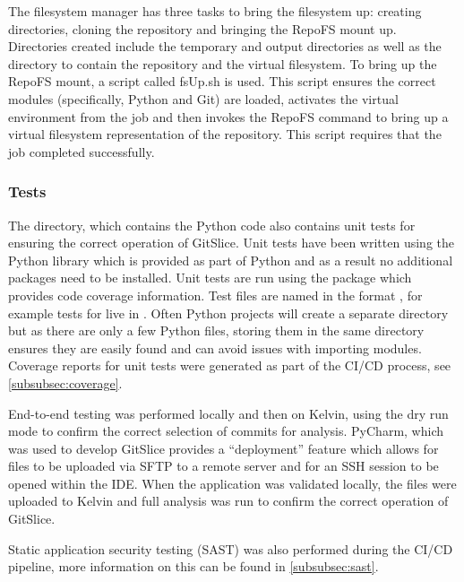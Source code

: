 \documentclass[11pt]{article}
\begin{document}
    The filesystem manager has three tasks to bring the filesystem up: creating directories, cloning the repository and bringing the RepoFS mount up.
    Directories created include the temporary and output directories as well as the directory to contain the repository and the virtual filesystem.
    To bring up the RepoFS mount, a script called fsUp.sh is used.
    This script ensures the correct modules (specifically, Python and Git) are loaded, activates the virtual environment from the  job and then invokes the RepoFS command to bring up a virtual filesystem representation of the repository.
    This script requires that the  job completed successfully.
    
    \subsubsection{Tests}
    \label{subsubsec:tests}

    The  directory, which contains the Python code also contains unit tests for ensuring the correct operation of GitSlice.
    Unit tests have been written using the Python  library which is provided as part of Python and as a result no additional packages need to be installed.
    Unit tests are run using the  package which provides code coverage information.
    Test files are named in the format , for example tests for  live in .
    Often Python projects will create a separate  directory but as there are only a few Python files, storing them in the same directory ensures they are easily found and can avoid issues with importing modules.
    Coverage reports for unit tests were generated as part of the CI/CD process, see \autoref{subsubsec:coverage}.

    End-to-end testing was performed locally and then on Kelvin, using the dry run mode to confirm the correct selection of commits for analysis.
    PyCharm, which was used to develop GitSlice provides a ``deployment'' feature which allows for files to be uploaded via SFTP to a remote server and for an SSH session to be opened within the IDE.
    When the application was validated locally, the files were uploaded to Kelvin and full analysis was run to confirm the correct operation of GitSlice.

    Static application security testing (SAST) was also performed during the CI/CD pipeline, more information on this can be found in \autoref{subsubsec:sast}.
\end{document}
